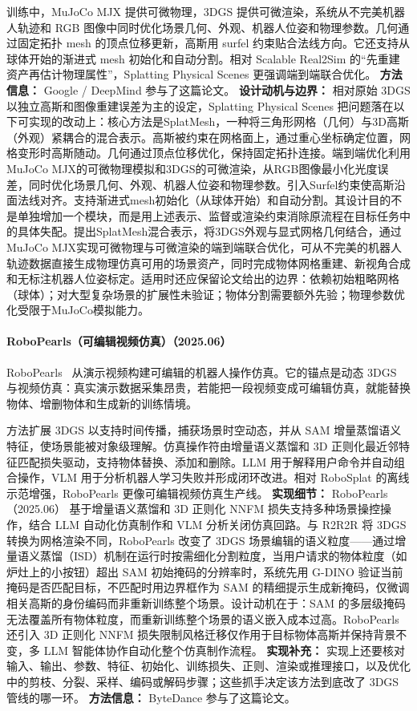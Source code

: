 训练中，MuJoCo MJX 提供可微物理，3DGS 提供可微渲染，系统从不完美机器人轨迹和 RGB 图像中同时优化场景几何、外观、机器人位姿和物理参数。几何通过固定拓扑 mesh 的顶点位移更新，高斯用 surfel 约束贴合法线方向。它还支持从球体开始的渐进式 mesh 初始化和自动分割。相对 Scalable Real2Sim 的“先重建资产再估计物理属性”，Splatting Physical Scenes 更强调端到端联合优化。
\textbf{方法信息：} Google / DeepMind 参与了这篇论文。
\textbf{设计动机与边界：} 相对原始 3DGS 以独立高斯和图像重建误差为主的设定，Splatting Physical Scenes 把问题落在以下可实现的改动上：核心方法是SplatMesh，一种将三角形网格（几何）与3D高斯（外观）紧耦合的混合表示。高斯被约束在网格面上，通过重心坐标确定位置，网格变形时高斯随动。几何通过顶点位移优化，保持固定拓扑连接。端到端优化利用MuJoCo MJX的可微物理模拟和3DGS的可微渲染，从RGB图像最小化光度误差，同时优化场景几何、外观、机器人位姿和物理参数。引入Surfel约束使高斯沿面法线对齐。支持渐进式mesh初始化（从球体开始）和自动分割。其设计目的不是单独增加一个模块，而是用上述表示、监督或渲染约束消除原流程在目标任务中的具体失配。提出SplatMesh混合表示，将3DGS外观与显式网格几何结合，通过MuJoCo MJX实现可微物理与可微渲染的端到端联合优化，可从不完美的机器人轨迹数据直接生成物理仿真可用的场景资产，同时完成物体网格重建、新视角合成和无标注机器人位姿标定。适用时还应保留论文给出的边界：依赖初始粗略网格（球体）；对大型复杂场景的扩展性未验证；物体分割需要额外先验；物理参数优化受限于MuJoCo模拟能力。
\paragraph{RoboPearls（可编辑视频仿真）（2025.06）}
RoboPearls~\cite{2506_22756} 从演示视频构建可编辑的机器人操作仿真。它的锚点是动态 3DGS 与视频仿真：真实演示数据采集昂贵，若能把一段视频变成可编辑仿真，就能替换物体、增删物体和生成新的训练情境。

方法扩展 3DGS 以支持时间传播，捕获场景时空动态，并从 SAM 增量蒸馏语义特征，使场景能被对象级理解。仿真操作符由增量语义蒸馏和 3D 正则化最近邻特征匹配损失驱动，支持物体替换、添加和删除。LLM 用于解释用户命令并自动组合操作，VLM 用于分析机器人学习失败并形成闭环改进。相对 RoboSplat 的离线示范增强，RoboPearls 更像可编辑视频仿真生产线。
\textbf{实现细节：} RoboPearls（2025.06） 基于增量语义蒸馏和 3D 正则化 NNFM 损失支持多种场景操控操作，结合 LLM 自动化仿真制作和 VLM 分析关闭仿真回路。与 R2R2R 将 3DGS 转换为网格渲染不同，RoboPearls 改变了 3DGS 场景编辑的语义粒度——通过增量语义蒸馏（ISD）机制在运行时按需细化分割粒度，当用户请求的物体粒度（如炉灶上的小按钮）超出 SAM 初始掩码的分辨率时，系统先用 G-DINO 验证当前掩码是否匹配目标，不匹配时用边界框作为 SAM 的精细提示生成新掩码，仅微调相关高斯的身份编码而非重新训练整个场景。设计动机在于：SAM 的多层级掩码无法覆盖所有物体粒度，而重新训练整个场景的语义嵌入成本过高。RoboPearls 还引入 3D 正则化 NNFM 损失限制风格迁移仅作用于目标物体高斯并保持背景不变，多 LLM 智能体协作自动化整个仿真制作流程。
\textbf{实现补充：} 实现上还要核对输入、输出、参数、特征、初始化、训练损失、正则、渲染或推理接口，以及优化中的剪枝、分裂、采样、编码或解码步骤；这些抓手决定该方法到底改了 3DGS 管线的哪一环。
\textbf{方法信息：} ByteDance 参与了这篇论文。



